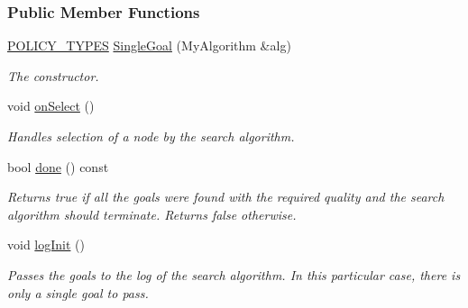 \subsubsection*{Public Member Functions}
\begin{DoxyCompactItemize}
\item 
\hyperlink{extensions_2shared__policies_2headers_8h_ae70a06fa4631780beea14971eb36a562}{P\+O\+L\+I\+C\+Y\+\_\+\+T\+Y\+P\+ES} \hyperlink{structslb_1_1ext_1_1policy_1_1goalHandler_1_1SingleGoal_a9b3932f97ce31f7d4f87b2caefccfccf}{Single\+Goal} (My\+Algorithm \&alg)
\begin{DoxyCompactList}\small\item\em The constructor. \end{DoxyCompactList}\item 
void \hyperlink{structslb_1_1ext_1_1policy_1_1goalHandler_1_1SingleGoal_ae69154ab6aa82a26e4347363f3d9ebfc}{on\+Select} ()\hypertarget{structslb_1_1ext_1_1policy_1_1goalHandler_1_1SingleGoal_ae69154ab6aa82a26e4347363f3d9ebfc}{}\label{structslb_1_1ext_1_1policy_1_1goalHandler_1_1SingleGoal_ae69154ab6aa82a26e4347363f3d9ebfc}

\begin{DoxyCompactList}\small\item\em Handles selection of a node by the search algorithm. \end{DoxyCompactList}\item 
bool \hyperlink{structslb_1_1ext_1_1policy_1_1goalHandler_1_1SingleGoal_abd5eb39d5693c8d6e95ec75fdb20ac3b}{done} () const 
\begin{DoxyCompactList}\small\item\em Returns {\ttfamily true} if all the goals were found with the required quality and the search algorithm should terminate. Returns {\ttfamily false} otherwise. \end{DoxyCompactList}\item 
void \hyperlink{structslb_1_1ext_1_1policy_1_1goalHandler_1_1SingleGoal_ab26c3f59cc2b6ebdde7eb9afdb41a1ee}{log\+Init} ()\hypertarget{structslb_1_1ext_1_1policy_1_1goalHandler_1_1SingleGoal_ab26c3f59cc2b6ebdde7eb9afdb41a1ee}{}\label{structslb_1_1ext_1_1policy_1_1goalHandler_1_1SingleGoal_ab26c3f59cc2b6ebdde7eb9afdb41a1ee}

\begin{DoxyCompactList}\small\item\em Passes the goals to the log of the search algorithm. In this particular case, there is only a single goal to pass. \end{DoxyCompactList}\end{DoxyCompactItemize}
